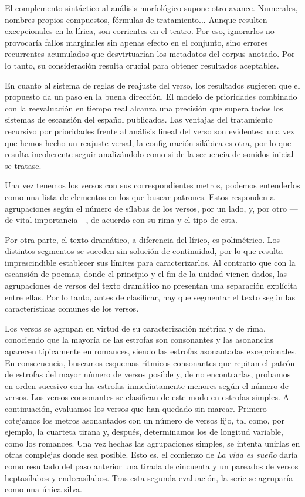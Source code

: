 El complemento sintáctico al análisis morfológico supone otro avance. Numerales, nombres propios compuestos, fórmulas de tratamiento... Aunque resulten excepcionales en la lírica, son corrientes en el teatro. Por eso, ignorarlos no provocaría fallos marginales sin apenas efecto en el conjunto, sino errores recurrentes acumulados que desvirtuarían los metadatos del corpus anotado. Por lo tanto, su consideración resulta crucial para obtener resultados aceptables.

En cuanto al sistema de reglas de reajuste del verso, los resultados sugieren que el propuesto da un paso en la buena dirección. El modelo de prioridades combinado con la reevaluación en tiempo real alcanza una precisión que supera todos los sistemas de escansión del español publicados. Las ventajas del tratamiento recursivo por prioridades frente al análisis lineal del verso son evidentes: una vez que hemos hecho un reajuste versal, la configuración silábica es otra, por lo que resulta incoherente seguir analizándolo como si de la secuencia de sonidos inicial se tratase.

Una vez tenemos los versos con sus correspondientes metros, podemos entenderlos como una lista de elementos en los que buscar patrones. Estos responden a agrupaciones según el número de sílabas de los versos, por un lado, y, por otro —de vital importancia—, de acuerdo con su rima y el tipo de esta.

Por otra parte, el texto dramático, a diferencia del lírico, es polimétrico. Los distintos segmentos se suceden sin solución de continuidad, por lo que resulta imprescindible establecer sus límites para caracterizarlos. Al contrario que con la escansión de poemas, donde el principio y el fin de la unidad vienen dados, las agrupaciones de versos del texto dramático no presentan una separación explícita entre ellas. Por lo tanto, antes de clasificar, hay que segmentar el texto según las características comunes de los versos.

Los versos se agrupan en virtud de su caracterización métrica y de rima, conociendo que la mayoría de las estrofas son consonantes y las asonancias aparecen típicamente en romances, siendo las estrofas asonantadas excepcionales. En consecuencia, buscamos esquemas rítmicos consonantes que repitan el patrón de estrofas del mayor número de versos posible y, de no encontrarlas, probamos en orden sucesivo con las estrofas inmediatamente menores según el número de versos. Los versos consonantes se clasifican de este modo en estrofas simples. A continuación, evaluamos  los versos que han quedado sin marcar. Primero cotejamos los metros asonantados con un número de versos fijo, tal como, por ejemplo, la cuarteta tirana y, después, determinamos los de longitud variable, como los romances. Una vez hechas las agrupaciones simples, se intenta unirlas en otras complejas donde sea posible. Esto es, el comienzo de \textit{La vida es sueño} daría como resultado del paso anterior una tirada  de cincuenta y un pareados de versos heptasílabos y endecasílabos. Tras esta segunda evaluación, la serie se agruparía como una única silva.


